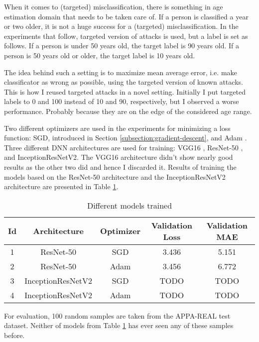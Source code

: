 When it comes to (targeted) misclassification, there is something in age estimation domain that needs to be taken care of. If a person is classified a year or two older, it is not a huge success for a (targeted) misclassification. In the experiments that follow, targeted version of attacks is used, but a label is set as follows. If a person is under 50 years old, the target label is 90 years old. If a person is 50 years old or older, the target label is 10 years old. 

The idea behind such a setting is to maximize mean average error, i.e. make classificator as wrong as possible, using the targeted version of known attacks.  This is how I reused targeted attacks in a novel setting. Initially I put targeted labels to 0 and 100 instead of 10 and 90, respectively, but I observed a worse performance. Probably because they are on the edge of the considered age range.

Two different optimizers are used in the experiments for minimizing a loss function: SGD, introduced in Section \ref{subsection:gradient-descent}, and Adam \cite{DBLP:journals/corr/KingmaB14}. Three different DNN architectures are used for training: VGG16 \cite{DBLP:journals/corr/SimonyanZ14a}, ResNet-50 \cite{DBLP:journals/corr/HeZRS15}, and InceptionResNetV2\cite{DBLP:journals/corr/SzegedyIV16}. The VGG16 architecture didn't show nearly good results as the other two did and hence I discarded it. Results of training the models based on the ResNet-50 architecture and the InceptionResNetV2 architecture are presented in Table \ref{table:trained-models}.

\begin{table}[]
\centering
\begin{tabular}{|c|c|c|c|c|}
\hline
Id & Architecture & Optimizer & Validation Loss & \textbf{Validation MAE} \\ \hline
1 & ResNet-50 & SGD & 3.436 & 5.151 \\ \hline
2 & ResNet-50 & Adam & 3.456 & 6.772 \\ \hline
3 & InceptionResNetV2 & SGD & TODO & TODO  \\ \hline
4 & InceptionResNetV2 & Adam & TODO & TODO \\ \hline
\end{tabular}
\caption{Different models trained}
\label{table:trained-models}
\end{table}

For evaluation, 100 random samples are taken from the APPA-REAL test dataset. Neither of models from Table \ref{table:trained-models} has ever seen any of these samples before.
